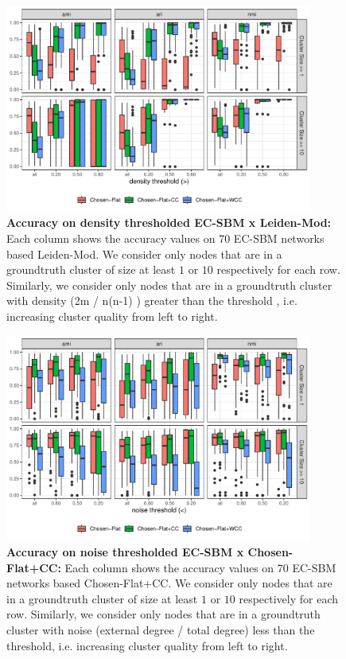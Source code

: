 \documentclass[aps,pre,superscriptaddress]{article}
\begin{document}
\begin{figure}[!htpb]
    \centering
    \includegraphics[width=0.9\textwidth]{figures/density_acc_leidenmod.pdf}
    \caption[]{\textbf{Accuracy on density thresholded EC-SBM x Leiden-Mod:} 
        Each column shows the accuracy values on 70 EC-SBM networks based Leiden-Mod. 
        We consider only nodes that are in a groundtruth cluster of size at least $1$ or $10$ respectively for each row.
        Similarly, we consider only nodes that are in a groundtruth cluster with density (2m / n(n-1) ) greater than the threshold , i.e. increasing cluster quality from left to right. }
\end{figure}

\begin{figure}[!htpb]
    \centering
    \includegraphics[width=0.9\textwidth]{figures/noise_acc_sbm.pdf}
    \caption[]{\textbf{Accuracy on noise thresholded EC-SBM x Chosen-Flat+CC:} 
        Each column shows the accuracy values on 70 EC-SBM networks based Chosen-Flat+CC. 
        We consider only nodes that are in a groundtruth cluster of size at least $1$ or $10$ respectively for each row.
        Similarly, we consider only nodes that are in a groundtruth cluster with noise (external degree / total degree) less than the threshold, i.e. increasing cluster quality from left to right. }
\end{figure}
\end{document}

